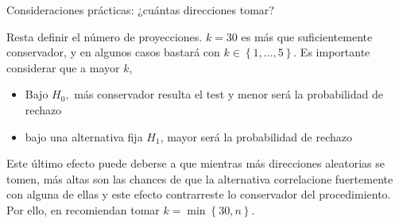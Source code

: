 \documentclass[10pt,spanish]{beamer}\usepackage[]{graphicx}\usepackage[]{color}
\begin{document}
%
\begin{frame}{Consideraciones prácticas: ¿cuántas direcciones tomar?}

Resta definir el número de proyecciones. $k=30$ es más que suficientemente
conservador, y en algunos casos bastará con $k\in\left\{ 1,\dots,5\right\} $.
Es importante considerar que a mayor $k$,

\pause{}
\begin{itemize}
\item Bajo $H_{0},$ más conservador resulta el test y menor será la probabilidad
de rechazo
\end{itemize}

\pause{}
\begin{itemize}
\item bajo una alternativa fija $H_{1}$, mayor será la probabilidad de
rechazo
\end{itemize}

\pause{}

Este último efecto puede deberse a que mientras más direcciones aleatorias
se tomen, más altas son las chances de que la alternativa correlacione
fuertemente con alguna de ellas y este efecto contrarreste lo conservador
del procedimiento. Por ello, en \cite{Cuesta 2010} recomiendan tomar
$k=\min\left\{ 30,n\right\} .$
\end{frame}
\end{document}
